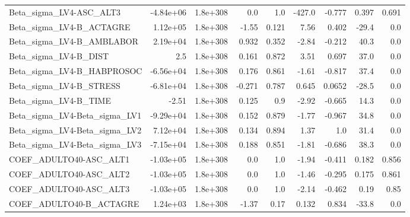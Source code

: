 \begin{tabular}{lrrrrrrrr}
Beta\_sigma\_LV4-ASC\_ALT3           &   -4.84e+06 &     1.8e+308 &      0.0 &      1.0 &     -427.0 &      -0.777 &        0.397 &         0.691 \\
Beta\_sigma\_LV4-B\_ACTAGRE          &    1.12e+05 &     1.8e+308 &    -1.55 &    0.121 &       7.56 &       0.402 &        -29.4 &           0.0 \\
Beta\_sigma\_LV4-B\_AMBLABOR         &    2.19e+04 &     1.8e+308 &    0.932 &    0.352 &      -2.84 &      -0.212 &         40.3 &           0.0 \\
Beta\_sigma\_LV4-B\_DIST             &         2.5 &     1.8e+308 &    0.161 &    0.872 &       3.51 &       0.697 &         37.0 &           0.0 \\
Beta\_sigma\_LV4-B\_HABPROSOC        &   -6.56e+04 &     1.8e+308 &    0.176 &    0.861 &      -1.61 &      -0.817 &         37.4 &           0.0 \\
Beta\_sigma\_LV4-B\_STRESS           &   -6.81e+04 &     1.8e+308 &   -0.271 &    0.787 &      0.645 &      0.0652 &        -28.5 &           0.0 \\
Beta\_sigma\_LV4-B\_TIME             &       -2.51 &     1.8e+308 &    0.125 &      0.9 &      -2.92 &      -0.665 &         14.3 &           0.0 \\
Beta\_sigma\_LV4-Beta\_sigma\_LV1     &   -9.29e+04 &     1.8e+308 &    0.152 &    0.879 &      -1.77 &      -0.967 &         34.8 &           0.0 \\
Beta\_sigma\_LV4-Beta\_sigma\_LV2     &    7.12e+04 &     1.8e+308 &    0.134 &    0.894 &       1.37 &         1.0 &         31.4 &           0.0 \\
Beta\_sigma\_LV4-Beta\_sigma\_LV3     &   -7.15e+04 &     1.8e+308 &    0.188 &    0.851 &      -1.81 &      -0.686 &         38.3 &           0.0 \\
COEF\_ADULTO40-ASC\_ALT1            &   -1.03e+05 &     1.8e+308 &      0.0 &      1.0 &      -1.94 &      -0.411 &        0.182 &         0.856 \\
COEF\_ADULTO40-ASC\_ALT2            &   -1.03e+05 &     1.8e+308 &      0.0 &      1.0 &      -1.46 &      -0.295 &        0.175 &         0.861 \\
COEF\_ADULTO40-ASC\_ALT3            &   -1.03e+05 &     1.8e+308 &      0.0 &      1.0 &      -2.14 &      -0.462 &         0.19 &          0.85 \\
COEF\_ADULTO40-B\_ACTAGRE           &    1.24e+03 &     1.8e+308 &    -1.37 &     0.17 &      0.132 &       0.834 &        -33.8 &           0.0 \\

\end{tabular}
